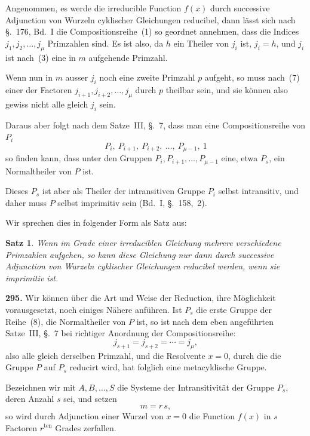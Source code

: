 \documentclass[12pt,a4paper]{article}
\newtheorem*{satz}{Satz}
\begin{document}
Angenommen, es werde die irreducible Function $f(x)$ durch successive Adjunction von Wurzeln cyklischer Gleichungen reducibel, dann l\"asst sich nach \S.~176, Bd.~I die Compositionsreihe~(1) so geordnet annehmen, dass die Indices $j_1,j_2,\ldots,j_{\mu}$ Primzahlen sind. Es ist also, da $h$ ein Theiler von $j_i$ ist, $j_i = h$, und $j_i$ ist nach~(3) eine in $m$ aufgehende Primzahl.

Wenn nun in $m$ ausser $j_i$ noch eine zweite Primzahl $p$ aufgeht, so muss nach~(7) einer der Factoren $j_{i+1},j_{i+2},\ldots,j_{\mu}$ durch $p$ theilbar sein, und sie k\"onnen also gewiss nicht alle gleich $j_i$ sein.

Daraus aber folgt nach dem Satze~III, \S.~7, dass man eine Compositionsreihe von $P_i$
\begin{equation}
\tag{8}
P_i,\ P_{i+1},\ P_{i+2},\ \ldots,\ P_{\mu-1},\ 1
\end{equation}
so finden kann, dass unter den Gruppen $P_i,P_{i+1},\ldots,P_{\mu-1}$ eine, etwa $P_s$, ein Normaltheiler von $P$ ist.

Dieses $P_s$ ist aber als Theiler der intransitiven Gruppe $P_i$ selbst intransitiv, und daher muss $P$ selbst imprimitiv sein (Bd.~I, \S.~158,~2).

Wir sprechen dies in folgender Form als Satz aus:

\begin{satz}
Wenn im Grade einer irreduciblen Gleichung mehrere verschiedene Primzahlen aufgehen, so kann diese Gleichung nur dann durch successive Adjunction von Wurzeln cyklischer Gleichungen reducibel werden, wenn sie imprimitiv ist.
\end{satz}

\bigskip
\noindent\textbf{295.} Wir k\"onnen \"uber die Art und Weise der Reduction, ihre M\"oglichkeit vorausgesetzt, noch einiges N\"ahere anf\"uhren. Ist $P_s$ die erste Gruppe der Reihe~(8), die Normaltheiler von $P$ ist, so ist nach dem eben angef\"uhrten Satze~III, \S.~7 bei richtiger Anordnung der Compositionsreihe:
\begin{equation}
\tag{9}
j_{s+1} = j_{s+2} = \cdots = j_{\mu},
\end{equation}
also alle gleich derselben Primzahl, und die Resolvente $x=0$, durch die die Gruppe $P$ auf $P_s$ reducirt wird, hat folglich eine metacyklische Gruppe.

Bezeichnen wir mit $A,B,\ldots,S$ die Systeme der Intransitivit\"at der Gruppe $P_s$, deren Anzahl $s$ sei, und setzen
\begin{equation}
\tag{10}
m = r\,s,
\end{equation}
so wird durch Adjunction einer Wurzel von $x=0$ die Function $f(x)$ in $s$ Factoren $r^{\text{ten}}$ Grades zerfallen.
\end{document}
